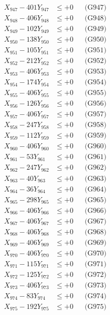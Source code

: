 \documentclass[a4paper,10pt]{article}
\begin{document}
{\begin{align}
X_{947} - 401Y_{947} &\leq +0 && \text{(G947)} \\
X_{948} - 406Y_{948} &\leq +0 && \text{(G948)} \\
X_{949} - 102Y_{949} &\leq +0 && \text{(G949)} \\
X_{950} - 138Y_{950} &\leq +0 && \text{(G950)} \\
\allowbreak
X_{951} - 105Y_{951} &\leq +0 && \text{(G951)} \\
X_{952} - 212Y_{952} &\leq +0 && \text{(G952)} \\
X_{953} - 406Y_{953} &\leq +0 && \text{(G953)} \\
X_{954} - 174Y_{954} &\leq +0 && \text{(G954)} \\
X_{955} - 406Y_{955} &\leq +0 && \text{(G955)} \\
X_{956} - 126Y_{956} &\leq +0 && \text{(G956)} \\
X_{957} - 406Y_{957} &\leq +0 && \text{(G957)} \\
X_{958} - 247Y_{958} &\leq +0 && \text{(G958)} \\
X_{959} - 112Y_{959} &\leq +0 && \text{(G959)} \\
X_{960} - 406Y_{960} &\leq +0 && \text{(G960)} \\
\allowbreak
X_{961} - 53Y_{961} &\leq +0 && \text{(G961)} \\
X_{962} - 247Y_{962} &\leq +0 && \text{(G962)} \\
X_{963} - 40Y_{963} &\leq +0 && \text{(G963)} \\
X_{964} - 36Y_{964} &\leq +0 && \text{(G964)} \\
X_{965} - 298Y_{965} &\leq +0 && \text{(G965)} \\
X_{966} - 406Y_{966} &\leq +0 && \text{(G966)} \\
X_{967} - 406Y_{967} &\leq +0 && \text{(G967)} \\
X_{968} - 406Y_{968} &\leq +0 && \text{(G968)} \\
X_{969} - 406Y_{969} &\leq +0 && \text{(G969)} \\
X_{970} - 406Y_{970} &\leq +0 && \text{(G970)} \\
\allowbreak
X_{971} - 115Y_{971} &\leq +0 && \text{(G971)} \\
X_{972} - 125Y_{972} &\leq +0 && \text{(G972)} \\
X_{973} - 406Y_{973} &\leq +0 && \text{(G973)} \\
X_{974} - 83Y_{974} &\leq +0 && \text{(G974)} \\
X_{975} - 192Y_{975} &\leq +0 && \text{(G975)} \\

\end{align}}
\end{document}
